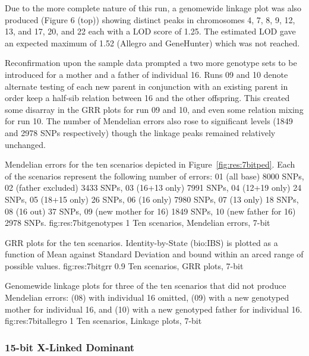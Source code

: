 \enlargethispage{-\baselineskip}
Due to the more complete nature of this run, a genomewide linkage plot was also produced (Figure 6 (top)) showing distinct peaks in chromosomes 4, 7, 8, 9, 12, 13, and 17, 20, and 22 each with a LOD score of 1.25. The estimated LOD gave an expected maximum of 1.52 (Allegro and GeneHunter) which was not reached.

Reconfirmation upon the sample data prompted a two more genotype sets to be introduced for a mother and a father of individual 16. Runs 09 and 10 denote alternate testing of each new parent in conjunction with an existing parent in order keep a half-sib relation between 16 and the other offspring.
This created some disarray in the GRR plots for run 09 and 10, and even some relation mixing for run 10. The number of Mendelian errors also rose to significant levels (1849 and 2978 SNPs respectively) though the linkage peaks remained relatively unchanged.

{Mendelian errors for the ten scenarios depicted in Figure~\ref{fig:res:7bitped}. Each of the scenarios represent the following number of errors: 01 (all base) 8000 SNPs, 02 (father excluded) 3433 SNPs, 03 (16+13 only) 7991 SNPs, 04 (12+19 only) 24 SNPs, 05 (18+15 only) 26 SNPs, 06 (16 only) 7980 SNPs, 07 (13 only) 18 SNPs, 08 (16 out) 37 SNPs, 09 (new mother for 16) 1849 SNPs, 10 (new father for 16) 2978 SNPs.}
{fig:res:7bitgenotypes}
{1}
{Ten scenarios, Mendelian errors, 7-bit}

{GRR plots for the ten scenarios. Identity-by-State (\gls{bio:IBS}) is plotted as a function of Mean against Standard Deviation and bound within an arced range of possible values.}
{fig:res:7bitgrr}
{0.9}
{Ten scenarios, GRR plots, 7-bit}

{Genomewide linkage plots for three of the ten scenarios that did not produce Mendelian errors: (08) with individual 16 omitted, (09) with a new genotyped mother for individual 16, and (10) with a new genotyped father for individual 16.}
{fig:res:7bitallegro}
{1}
{Ten scenarios, Linkage plots, 7-bit}


\subsubsection*{15-bit X-Linked Dominant}

